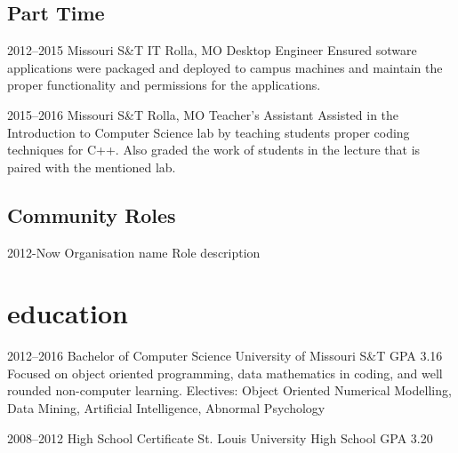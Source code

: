 \documentclass[]{friggeri-cv} %
\begin{document}
\subsection{Part Time}

\begin{entrylist}


\entry
{2012--2015}
{Missouri S\&T IT}
{Rolla, MO}
{Desktop Engineer}
{ 
Ensured sotware applications were packaged and deployed to campus machines and maintain the proper functionality and permissions for the applications.
}

\entry
{2015--2016}
{Missouri S\&T}
{Rolla, MO}
{Teacher's Assistant}
{ 
Assisted in the Introduction to Computer Science lab by teaching students proper coding techniques for C++. Also graded the work of students in the lecture that is paired with the mentioned lab.
}



\end{entrylist}




\subsection{Community Roles}

\begin{entrylist}


\entry
{2012-Now}
{Organisation name} 
{}
{Role}
{
description
}




\end{entrylist}


\section{education}

\begin{entrylist} 


\entry
{2012--2016}
{Bachelor {\normalfont of Computer Science}}
{University of Missouri S\&T}
{GPA 3.16}
{
Focused on object oriented programming, data mathematics in coding, and well rounded non-computer learning. Electives: Object Oriented Numerical Modelling, Data Mining, Artificial Intelligence, Abnormal Psychology
}


\entry
{2008--2012}  
{High School Certificate}
{St. Louis University High School}
{GPA 3.20} 
{
}


\end{entrylist}
\end{document}
